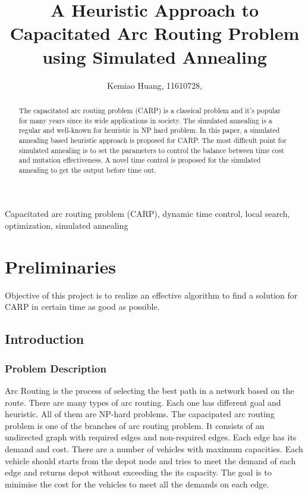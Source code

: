 \documentclass[9pt,shortpaper,twoside,web]{ieeecolor}
\begin{document}
\title{\bigskip\bigskip A Heuristic Approach to Capacitated Arc Routing Problem using Simulated Annealing}
\author{Kemiao Huang, 11610728, }
\maketitle

\begin{abstract}
The capacitated arc routing problem (CARP) is a classical problem and it's popular for many years since its wide applications in society. The simulated annealing is a regular and well-known for heuristic in NP hard problem. In this paper, a simulated annealing based heuristic approach is proposed for CARP. The most difficult point for simulated annealing is to set the parameters to control the balance between time cost and mutation effectiveness. A novel time control is proposed for the simulated annealing to get the output before time out.
\end{abstract}

\begin{IEEEkeywords}
Capacitated arc routing problem (CARP), dynamic time control, local search, optimization, simulated annealing
\end{IEEEkeywords}

\section{Preliminaries}
 Objective of this project is to realize an effective algorithm to find a solution for CARP in certain time as good as possible.  

\subsection{Introduction}
\subsubsection{Problem Description}
Arc Routing is the process of selecting the best path in a network based on the route. There are many types of arc routing. Each one has different goal and heuristic. All of them are NP-hard problems. The capacipated arc routing problem is one of the branches of arc routing problem. It consists of an undirected graph with required edges and non-required edges. Each edge has its demand and cost. There are a number of vehicles with maximum   capacities. Each vehicle should starts from the depot node and tries to meet the demand of each edge and returns depot without exceeding the its capacity. The goal is to minimise the cost for the vehicles to meet all the demands on each edge.     
\end{document}
